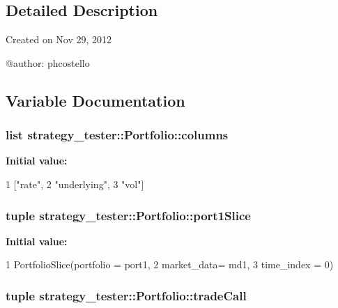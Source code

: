 \subsection{\-Detailed \-Description}
\begin{DoxyVerb}
Created on Nov 29, 2012

@author: phcostello
\end{DoxyVerb}
 

\subsection{\-Variable \-Documentation}
\hypertarget{namespacestrategy__tester_1_1Portfolio_a3019ce96c08e21a3e2eee59ddc0e2039}{
\subsubsection[{columns}]{\setlength{\rightskip}{0pt plus 5cm}list strategy\-\_\-tester\-::\-Portfolio\-::columns}}\label{namespacestrategy__tester_1_1Portfolio_a3019ce96c08e21a3e2eee59ddc0e2039}
{\bfseries \-Initial value\-:}
\begin{DoxyCode}
1 ["rate",
2                "underlying",
3                "vol"]
\end{DoxyCode}
\hypertarget{namespacestrategy__tester_1_1Portfolio_aa551d54e9ed0aeec6f43836bbc9de7b1}{
\subsubsection[{port1\-Slice}]{\setlength{\rightskip}{0pt plus 5cm}tuple strategy\-\_\-tester\-::\-Portfolio\-::port1\-Slice}}\label{namespacestrategy__tester_1_1Portfolio_aa551d54e9ed0aeec6f43836bbc9de7b1}
{\bfseries \-Initial value\-:}
\begin{DoxyCode}
1 PortfolioSlice(portfolio = port1, 
2                                 market_data= md1, 
3                                 time_index = 0)
\end{DoxyCode}
\hypertarget{namespacestrategy__tester_1_1Portfolio_a00bea9fbe56bb9efd1232b4a9c1f2dc9}{
\subsubsection[{trade\-Call}]{\setlength{\rightskip}{0pt plus 5cm}tuple strategy\-\_\-tester\-::\-Portfolio\-::trade\-Call}}\label{namespacestrategy__tester_1_1Portfolio_a00bea9fbe56bb9efd1232b4a9c1f2dc9}
